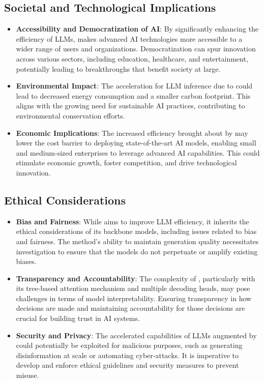 \subsection*{Societal and Technological Implications
}
\begin{itemize}
    \item \textbf{Accessibility and Democratization of AI}: By significantly enhancing the efficiency of LLMs, \ours makes advanced AI technologies more accessible to a wider range of users and organizations. Democratization can spur innovation across various sectors, including education, healthcare, and entertainment, potentially leading to breakthroughs that benefit society at large.
    \item \textbf{Environmental Impact}: The acceleration for LLM inference due to \ours could lead to decreased energy consumption and a smaller carbon footprint. This aligns with the growing need for sustainable AI practices, contributing to environmental conservation efforts.
    \item \textbf{Economic Implications}: The increased efficiency brought about by \ours may lower the cost barrier to deploying state-of-the-art AI models, enabling small and medium-sized enterprises to leverage advanced AI capabilities. This could stimulate economic growth, foster competition, and drive technological innovation.
    \end{itemize}
\subsection*{Ethical Considerations}
\begin{itemize}
    \item \textbf{Bias and Fairness}: While \ours aims to improve LLM efficiency, it inherits the ethical considerations of its backbone models, including issues related to bias and fairness. The method's ability to maintain generation quality necessitates investigation to ensure that the models do not perpetuate or amplify existing biases.

 \item \textbf{Transparency and Accountability}: The complexity of \ours, particularly with its tree-based attention mechanism and multiple decoding heads, may pose challenges in terms of model interpretability. Ensuring transparency in how decisions are made and maintaining accountability for those decisions are crucial for building trust in AI systems.

\item \textbf{Security and Privacy}: The accelerated capabilities of LLMs augmented by \ours could potentially be exploited for malicious purposes, such as generating disinformation at scale or automating cyber-attacks. It is imperative to develop and enforce ethical guidelines and security measures to prevent misuse.

\end{itemize}













